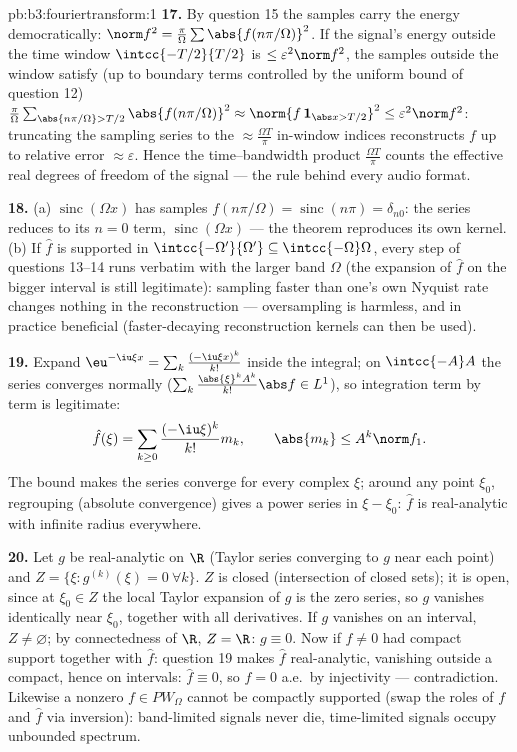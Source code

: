 \begin{solution}{pb:b3:fouriertransform:1}
\textbf{17.} By question 15 the samples carry the energy
democratically: $\norm f^2 = \frac\pi\Omega\sum
\abs{f(n\pi/\Omega)}^2$. If the signal's energy outside the
time window $\intcc{-T/2}{T/2}$ is $\leq \varepsilon^2\norm
f^2$, the samples outside the window satisfy (up to boundary
terms controlled by the uniform bound of question 12)
$\frac\pi\Omega\sum_{\abs{n\pi/\Omega} > T/2}
\abs{f(n\pi/\Omega)}^2 \approx \norm{f\,\mathbf 1_{\abs x >
T/2}}^2 \leq \varepsilon^2\norm f^2$: truncating the
sampling series to the $\approx \frac{\Omega T}\pi$
in-window indices reconstructs $f$ up to relative error
$\approx\varepsilon$. Hence the time--bandwidth product
$\frac{\Omega T}{\pi}$ counts the effective real degrees of
freedom of the signal --- the rule behind every audio
format.

\textbf{18.} (a) $\operatorname{sinc}(\Omega x)$ has
samples $f(n\pi/\Omega) = \operatorname{sinc}(n\pi) =
\delta_{n0}$: the series reduces to its $n = 0$ term,
$\operatorname{sinc}(\Omega x)$ --- the theorem reproduces
its own kernel. (b) If $\hat f$ is supported in
$\intcc{-\Omega'}{\Omega'} \subseteq
\intcc{-\Omega}\Omega$, every step of questions 13--14 runs
verbatim with the larger band $\Omega$ (the expansion of
$\hat f$ on the bigger interval is still legitimate):
sampling faster than one's own Nyquist rate changes nothing
in the reconstruction --- oversampling is harmless, and in
practice beneficial (faster-decaying reconstruction kernels
can then be used).

\textbf{19.} Expand $\eu^{-\iu\xi x} =
\sum_k\frac{(-\iu\xi x)^k}{k!}$ inside the integral; on
$\intcc{-A}A$ the series converges normally
($\sum_k\frac{\abs{\xi}^kA^k}{k!}\abs f \in L^1$), so
integration term by term is legitimate:
\[
\hat f(\xi) = \sum_{k\geq0}\frac{(-\iu\xi)^k}{k!}m_k,
\qquad \abs{m_k} \leq A^k\norm f_1 .
\]
The bound makes the series converge for every complex $\xi$;
around any point $\xi_0$, regrouping (absolute convergence)
gives a power series in $\xi - \xi_0$: $\hat f$ is
real-analytic with infinite radius everywhere.

\textbf{20.} Let $g$ be real-analytic on $\R$ (Taylor series
converging to $g$ near each point) and $Z = \{\xi :
g^{(k)}(\xi) = 0\ \forall k\}$. $Z$ is closed (intersection
of closed sets); it is open, since at $\xi_0 \in Z$ the local
Taylor expansion of $g$ is the zero series, so $g$ vanishes
identically near $\xi_0$, together with all derivatives. If
$g$ vanishes on an interval, $Z \neq \varnothing$; by
connectedness of $\R$, $Z = \R$: $g \equiv 0$. Now if $f
\neq 0$ had compact support together with $\hat f$: question
19 makes $\hat f$ real-analytic, vanishing outside a compact,
hence on intervals: $\hat f \equiv 0$, so $f = 0$ a.e.\ by
injectivity --- contradiction. Likewise a nonzero $f \in
PW_\Omega$ cannot be compactly supported (swap the roles of
$f$ and $\hat f$ via inversion): band-limited signals never
die, time-limited signals occupy unbounded spectrum.


\end{solution}
